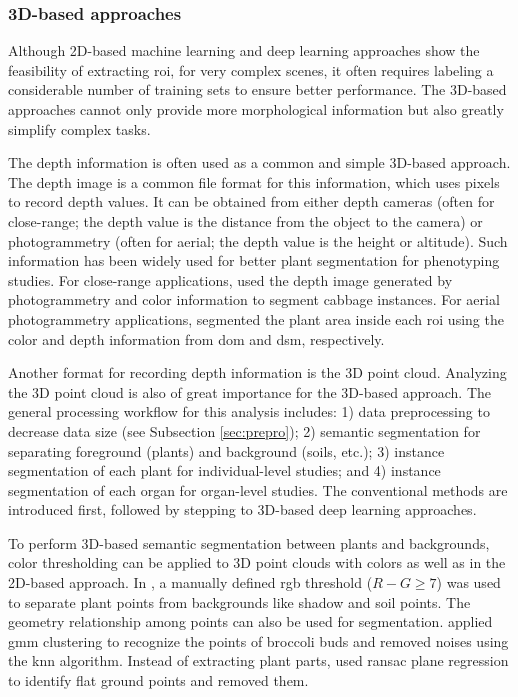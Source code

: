 \subsubsection{3D-based approaches}

Although 2D-based machine learning and deep learning approaches show the feasibility of extracting \gls{roi}, for very complex scenes, it often requires labeling a considerable number of training sets to ensure better performance. The 3D-based approaches cannot only provide more morphological information but also greatly simplify complex tasks.

The depth information is often used as a common and simple 3D-based approach. The depth image is a common file format for this information, which uses pixels to record depth values. It can be obtained from either depth cameras (often for close-range; the depth value is the distance from the object to the camera) or photogrammetry (often for aerial; the depth value is the height or altitude). Such information has been widely used for better plant segmentation for phenotyping studies. For close-range applications, \citep{luling_using_2021} used the depth image generated by photogrammetry and color information to segment cabbage instances. For aerial photogrammetry applications, \citet{guo_fieldbased_2020} segmented the plant area inside each \gls{roi} using the color and depth information from \gls{dom} and \gls{dsm}, respectively.

Another format for recording depth information is the 3D point cloud. Analyzing the 3D point cloud is also of great importance for the 3D-based approach. The general processing workflow for this analysis includes: 1) data preprocessing to decrease data size (see Subsection \ref{sec:prepro}); 2) semantic segmentation for separating foreground (plants) and background (soils, etc.); 3) instance segmentation of each plant for individual-level studies; and 4) instance segmentation of each organ for organ-level studies. The conventional methods are introduced first, followed by stepping to 3D-based deep learning approaches.

To perform 3D-based semantic segmentation between plants and backgrounds, color thresholding can be applied to 3D point clouds with colors as well as in the 2D-based approach. In \citet[Fig.~3]{xiao_image-based_2020}, a manually defined \gls{rgb} threshold ($R-G\geq7$) was used to separate plant points from backgrounds like shadow and soil points. The geometry relationship among points can also be used for segmentation. \citet{ge_method_2019} applied \gls{gmm} clustering to recognize the points of broccoli buds and removed noises using the \gls{knn} algorithm. Instead of extracting plant parts, \citet{garrido_3d_2015} used \gls{ransac} plane regression to identify flat ground points and removed them.

